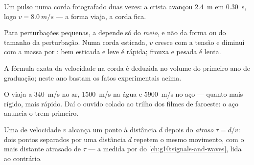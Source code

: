 \begin{omfigure}

{\small Um pulso numa corda fotografado duas vezes: a crista avançou
\qty{2.4}{m} em \qty{0.30}{s}, logo $v = \qty{8.0}{m/s}$ --- a forma
viaja, a corda fica.}
\end{omfigure}

\begin{proposition}\label{prop:g12:mechanical-waves:medium}
Para perturbações pequenas, a  depende só do
\emph{meio}, e não da forma ou do tamanho da perturbação. Numa corda
esticada, $v$ cresce com a tensão e diminui com a massa por : bem
esticada e leve é rápida; frouxa e pesada é lenta. \admitted
\end{proposition}

\begin{remark}\label{rem:g12:mechanical-waves:ropeformula}
A fórmula exata da velocidade na corda é deduzida no volume do primeiro
ano de graduação; neste ano bastam os fatos experimentais acima.
\end{remark}

\begin{example}\label{ex:g12:mechanical-waves:speeds}
O  viaja a \qty{340}{m/s} no ar, \qty{1500}{m/s} na água e
\qty{5900}{m/s} no aço --- quanto mais rígido, mais rápido. Daí o ouvido
colado ao trilho dos filmes de faroeste: o aço anuncia o trem primeiro.
\end{example}

\begin{definition}[Atraso]\label{def:g12:mechanical-waves:delay}
Uma  de velocidade $v$ alcança um ponto à distância $d$ depois do
\emph{atraso} $\tau = d/v$: dois pontos separados por uma
distância $d$ repetem o mesmo movimento, com o mais distante atrasado de
$\tau$ --- a medida por  do \cref{ch:g10:signals-and-waves}, lida ao
contrário.
\end{definition}


